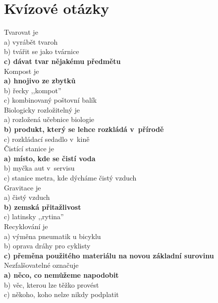 
\section{Kvízové otázky}
\begin{multicols}{3}

\noindent
Tvarovat je\\
a) vyrábět tvaroh\\
b) tvářit se jako tvárnice\\
\textbf{c) dávat tvar nějakému předmětu}\\

\noindent
Kompost je\\
\textbf{a) hnojivo ze zbytků}\\
b) řecky ,,kompot''\\
c) kombinovaný poštovní balík\\

\noindent
Biologicky rozložitelný je\\
a) rozložená učebnice biologie\\
\textbf{b) produkt, který se lehce rozkládá v~přírodě}\\
c) rozkládací sedadlo v~kině\\

\noindent
Čistící stanice je\\
\textbf{a) místo, kde se čistí voda}\\
b) myčka aut v~servisu\\
c) stanice metra, kde dýcháme čistý vzduch\\

\noindent
Gravitace je\\
a) čistý vzduch\\
\textbf{b) zemská přitažlivost}\\
c) latinsky ,,rytina''\\

\noindent
Recyklování je\\
a) výměna pneumatik u bicyklu\\
b) oprava dráhy pro cyklisty\\
\textbf{c) přeměna použitého materiálu na novou základní surovinu}\\

\noindent
Nezfalšovatelné označuje\\
\textbf{a) něco, co nemůžeme napodobit}\\
b) věc, kterou lze těžko provést\\
c) někoho, koho nelze nikdy podplatit\\


\end{multicols}
